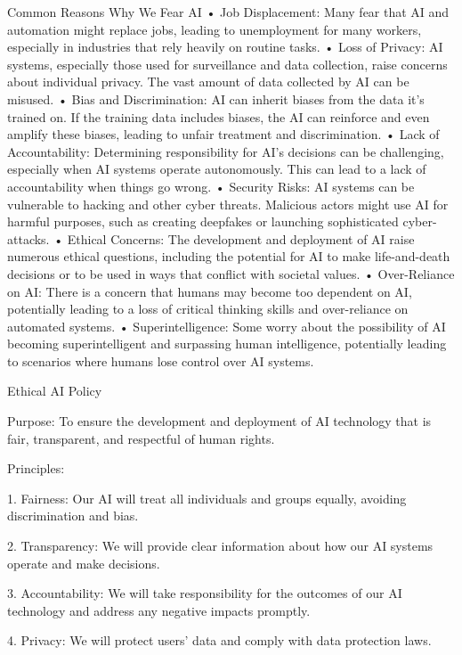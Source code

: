 \documentclass[12pt,letterpaper]{article}
\begin{document}
Common Reasons Why We Fear AI
•  Job Displacement: Many fear that AI and automation might replace jobs, leading to unemployment for many workers, especially in industries that rely heavily on routine tasks.
•  Loss of Privacy: AI systems, especially those used for surveillance and data collection, raise concerns about individual privacy. The vast amount of data collected by AI can be misused.
•  Bias and Discrimination: AI can inherit biases from the data it's trained on. If the training data includes biases, the AI can reinforce and even amplify these biases, leading to unfair treatment and discrimination.
•  Lack of Accountability: Determining responsibility for AI's decisions can be challenging, especially when AI systems operate autonomously. This can lead to a lack of accountability when things go wrong.
•  Security Risks: AI systems can be vulnerable to hacking and other cyber threats. Malicious actors might use AI for harmful purposes, such as creating deepfakes or launching sophisticated cyber-attacks.
•  Ethical Concerns: The development and deployment of AI raise numerous ethical questions, including the potential for AI to make life-and-death decisions or to be used in ways that conflict with societal values.
•  Over-Reliance on AI: There is a concern that humans may become too dependent on AI, potentially leading to a loss of critical thinking skills and over-reliance on automated systems.
•  Superintelligence: Some worry about the possibility of AI becoming superintelligent and surpassing human intelligence, potentially leading to scenarios where humans lose control over AI systems.
 







Ethical AI Policy

Purpose: To ensure the development and deployment of AI technology that is fair, transparent, and respectful of human rights.

Principles:

1. Fairness: Our AI will treat all individuals and groups equally, avoiding discrimination and bias.

2. Transparency: We will provide clear information about how our AI systems operate and make decisions.

3. Accountability: We will take responsibility for the outcomes of our AI technology and address any negative impacts promptly.

4. Privacy: We will protect users' data and comply with data protection laws.
\end{document}
